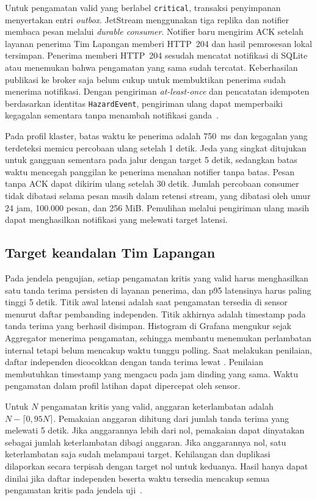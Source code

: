 Untuk pengamatan valid yang berlabel \texttt{critical}, transaksi penyimpanan menyertakan entri \textit{outbox}. JetStream menggunakan tiga replika dan notifier membaca pesan melalui \textit{durable consumer}. Notifier baru mengirim ACK setelah layanan penerima Tim Lapangan memberi HTTP~204 dan hasil pemrosesan lokal tersimpan. Penerima memberi HTTP~204 sesudah mencatat notifikasi di SQLite atau menemukan bahwa pengamatan yang sama sudah tercatat. Keberhasilan publikasi ke broker saja belum cukup untuk membuktikan penerima sudah menerima notifikasi. Dengan pengiriman \textit{at-least-once} dan pencatatan idempoten berdasarkan identitas \texttt{HazardEvent}, pengiriman ulang dapat memperbaiki kegagalan sementara tanpa menambah notifikasi ganda~\cite{nats}.

Pada profil klaster, batas waktu ke penerima adalah 750~ms dan kegagalan yang terdeteksi memicu percobaan ulang setelah 1 detik. Jeda yang singkat ditujukan untuk gangguan sementara pada jalur dengan target 5 detik, sedangkan batas waktu mencegah panggilan ke penerima menahan notifier tanpa batas. Pesan tanpa ACK dapat dikirim ulang setelah 30 detik. Jumlah percobaan consumer tidak dibatasi selama pesan masih dalam retensi stream, yang dibatasi oleh umur 24 jam, 100.000 pesan, dan 256 MiB. Pemulihan melalui pengiriman ulang masih dapat menghasilkan notifikasi yang melewati target latensi.

\subsection{Target keandalan Tim Lapangan}

Pada jendela pengujian, setiap pengamatan kritis yang valid harus menghasilkan satu tanda terima persisten di layanan penerima, dan p95 latensinya harus paling tinggi 5 detik. Titik awal latensi adalah saat pengamatan tersedia di sensor menurut daftar pembanding independen. Titik akhirnya adalah timestamp pada tanda terima yang berhasil disimpan. Histogram di Grafana mengukur sejak Aggregator menerima pengamatan, sehingga membantu menemukan perlambatan internal tetapi belum mencakup waktu tunggu polling. Saat melakukan penilaian, daftar independen dicocokkan dengan tanda terima lewat . Penilaian membutuhkan timestamp yang mengacu pada jam dinding yang sama. Waktu pengamatan dalam profil latihan dapat dipercepat oleh sensor.

Untuk $N$ pengamatan kritis yang valid, anggaran keterlambatan adalah $N-\lceil 0{,}95N\rceil$. Pemakaian anggaran dihitung dari jumlah tanda terima yang melewati 5 detik. Jika anggarannya lebih dari nol, pemakaian dapat dinyatakan sebagai jumlah keterlambatan dibagi anggaran. Jika anggarannya nol, satu keterlambatan saja sudah melampaui target. Kehilangan dan duplikasi dilaporkan secara terpisah dengan target nol untuk keduanya. Hasil hanya dapat dinilai jika daftar independen beserta waktu tersedia mencakup semua pengamatan kritis pada jendela uji~\cite{sre}.

